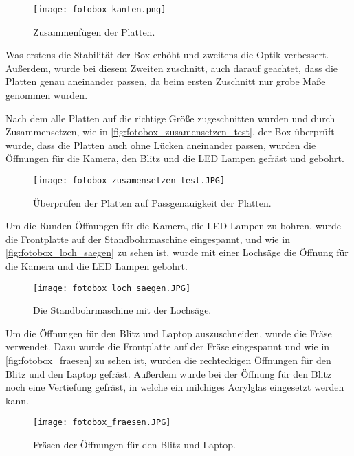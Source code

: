 \begin{figure}[H]
    \centering
    \texttt{[image: fotobox\_kanten.png]}
    \caption{Zusammenfügen der Platten.}
    \label{fig:fotobox_kanten}
\end{figure}

Was erstens die Stabilität der Box erhöht und zweitens die Optik verbessert. 
Außerdem, wurde bei diesem Zweiten zuschnitt, auch darauf geachtet, dass die
Platten genau aneinander passen, da beim ersten Zuschnitt nur grobe Maße
genommen wurden.

\newpage

Nach dem alle Platten auf die richtige Größe zugeschnitten wurden und durch
Zusammensetzen, wie in \autoref{fig:fotobox_zusamensetzen_test}, der Box überprüft
wurde, dass die Platten auch ohne Lücken aneinander passen, wurden die Öffnungen
für die Kamera, den Blitz und die LED Lampen gefräst und gebohrt.

\begin{figure}[H]
    \centering
    \texttt{[image: fotobox\_zusamensetzen\_test.JPG]}
    \caption{Überprüfen der Platten auf Passgenauigkeit der Platten.}
    \label{fig:fotobox_zusamensetzen_test}
\end{figure}

Um die Runden Öffnungen für die Kamera, die LED Lampen zu bohren, wurde die Frontplatte
auf der Standbohrmaschine eingespannt, und wie in \autoref{fig:fotobox_loch_saegen} zu sehen ist,
wurde mit einer Lochsäge die Öffnung für die Kamera und die LED Lampen gebohrt.

\begin{figure}[H]
    \centering
    \texttt{[image: fotobox\_loch\_saegen.JPG]}
    \caption{Die Standbohrmaschine mit der Lochsäge.}
    \label{fig:fotobox_loch_saegen}
\end{figure}

Um die Öffnungen für den Blitz und Laptop auszuschneiden, wurde die Fräse verwendet.
Dazu wurde die Frontplatte auf der Fräse eingespannt und wie in
\autoref{fig:fotobox_fraesen} zu sehen ist, wurden die rechteckigen Öffnungen
für den Blitz und den Laptop gefräst. Außerdem wurde bei der Öffnung für den Blitz
noch eine Vertiefung gefräst, in welche ein milchiges Acrylglas eingesetzt werden kann.

\begin{figure}[H]
    \centering
    \texttt{[image: fotobox\_fraesen.JPG]}
    \caption{Fräsen der Öffnungen für den Blitz und Laptop.}
    \label{fig:fotobox_fraesen}
\end{figure}


